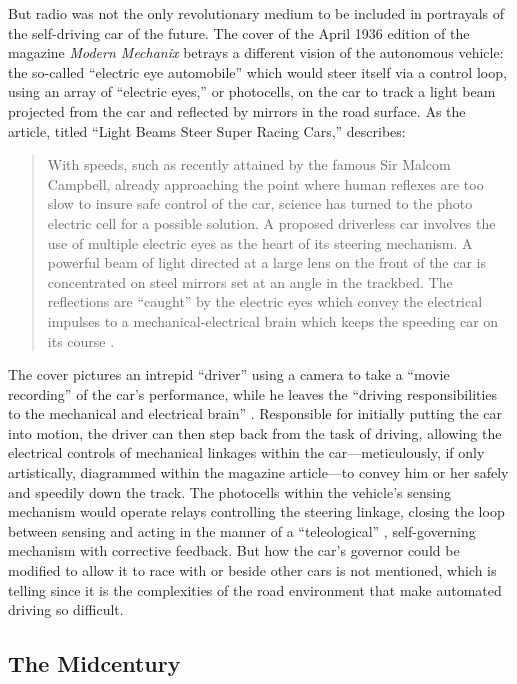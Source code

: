 But radio was not the only revolutionary medium to be included in
 portrayals of the self-driving car of the future. The cover of the
 April 1936 edition of the magazine \emph{Modern
   Mechanix} \cite{modernmechanix} betrays a 
 different vision of the autonomous vehicle: the so-called ``electric
 eye automobile'' which would steer itself via a control loop, using an
 array of ``electric eyes,'' or photocells, on the car to track a light
 beam projected from the car and reflected by mirrors in the road
 surface. As the article, titled ``Light Beams Steer Super Racing
 Cars,'' describes:
\begin{quote}
With speeds, such as recently attained by the famous Sir Malcom
Campbell, already approaching the point where human reflexes are too
slow to insure safe control of the car, science has turned to the
photo electric cell for a possible solution. A proposed driverless car
involves the use of multiple electric eyes as the heart of its
steering mechanism. A powerful beam of light directed at a large lens
on the front of the car is concentrated on steel mirrors set at an
angle in the trackbed. The reflections are ``caught'' by the electric
eyes which convey the electrical impulses to a mechanical-electrical
brain which keeps the speeding car on its course \cite[p. 71]{lightbeams}.
\end{quote}

The cover pictures an intrepid ``driver'' using a camera to take a
``movie recording'' of the car's performance, while he leaves the
``driving responsibilities to the mechanical and electrical brain''
\cite[p. 71]{lightbeams}.
Responsible for initially putting the car into motion, the driver can
then step back from the task of driving, allowing the electrical
controls of mechanical linkages within the car---meticulously, if only
artistically, diagrammed
within the magazine article---to convey him or her safely and speedily down
the track. The photocells within the vehicle's sensing mechanism would
operate relays controlling the steering linkage, closing the loop
between sensing and acting in the manner of a ``teleological''
\cite{behaviorPurpose}, 
self-governing mechanism with corrective feedback. But how
the car's governor could be modified to allow it to race with or
beside other cars is not mentioned, which is telling since it is the
complexities of the road environment that make automated driving so difficult.

\subsection{The Midcentury}

